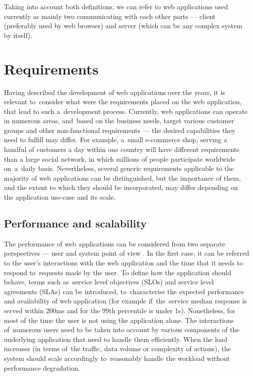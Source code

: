 Taking into account both definitions, we can refer to web applications used currently as mainly two communicating with each other parts --- client (preferably used by web browser) and server (which can be any complex system by itself).

\section{Requirements} \label{chapter:web-apps-requirements}

Having described the development of web applications over the years, it is relevant to~consider what were the requirements placed on the web application, that lead to such a~development process. Currently, web applications can operate in numerous areas, and~based on the business needs, target various customer groups and other non-functional requirements --- the desired capabilities they need to fulfill may differ. For example, a~small e-commerce shop, serving a handful of customers a day within one country will have different requirements than a large social network, in which millions of people participate worldwide on~a~daily basis. Nevertheless, several generic requirements applicable to the majority of web applications can be distinguished, but the importance of them, and the extent to which they should be incorporated, may differ depending on the application use-case and its scale.

\subsection{Performance and scalability}

The performance of web applications can be considered from two separate perspectives --- user and system point of view \cite{DesignDataIntensiveApplications}. In the first case, it can be referred to the user's interactions with the web application and the time that it needs to respond to~requests made by the user. To define how the application should behave, terms such as~service level objectives (SLOs) and service level agreements (SLAs) can be introduced, to~characterise the expected performance and availability of web application (for example if~the~service median response is served within 200ms and for the 99th percentile is under 1s). Nonetheless, for most of the time the user is not using the application alone. The interactions of~numerous users need to be taken into account by various components of the underlying application that need to handle them efficiently. When the load increases (in terms of~the traffic, data volume or complexity of actions), the system should scale accordingly to~reasonably handle the workload without performance degradation. 

